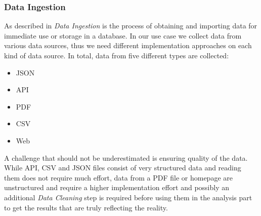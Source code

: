 \subsubsection{Data Ingestion}
\label{subsubsec:ingestion}
As described in \cite{ingestion} \textit{Data Ingestion} is the process of obtaining and importing data for immediate use or storage in a database. In our use case we collect data from various data sources, thus we need different implementation approaches on each kind of data source. \newline
In total, data from five different types are collected:
\begin{itemize}
  \item \ac{JSON}
  \item \ac{API} %
  \item \ac{PDF}
  \item \ac{CSV}
  \item Web %
\end{itemize}
A challenge that should not be underestimated is ensuring quality of the data.
While \ac{API}, \ac{CSV} and \ac{JSON} files consist of very structured data and reading them does not require much effort,
data from a \ac{PDF} file or homepage are unstructured and require a higher implementation effort and possibly an additional
\textit{Data Cleaning} step is required before using them in the analysis part to get the results that are truly reflecting the reality.
%
